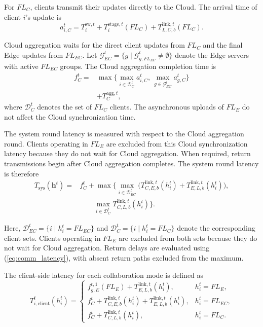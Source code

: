 \documentclass[5p,times]{elsarticle}
\theoremstyle{plain}
\theoremstyle{definition}
\theoremstyle{remark}
\begin{document}
For \(FL_C\), clients transmit their updates
directly to the Cloud. The arrival time of
client \(i\)'s update is
\begin{equation}
a_{i,C}^t
=
T_i^{\mathrm{sw},t}
+
T_i^{\mathrm{stage},t}(FL_C)
+
T_{L,C,b}^{\mathrm{link},t}(FL_C).
\end{equation}

Cloud aggregation waits for the direct client
updates from $FL_C$ and the final Edge updates
from $FL_{EC}$. 
Let $\mathcal G_{EC}^t
=\{g\mid\mathcal G_{g,FL_{EC}}^t
\neq\emptyset\}$ denote the Edge servers
with active $FL_{EC}$ groups. The Cloud aggregation
completion time is
\begin{equation}
\begin{aligned}
f_C^t
={}&
\max\Bigg\{
\max_{i\in\mathcal D_C^t} a_{i,C}^t,\,
\max_{g\in\mathcal G_{EC}^t} a_{g,C}^t
\Bigg\}\\
&+T_C^{\mathrm{agg},t},
\label{eq:cloud_agg_finish}
\end{aligned}
\end{equation}
where $\mathcal D_C^t$ denotes the set of
$FL_C$ clients. The asynchronous uploads
of $FL_E$ do not affect the Cloud
synchronization time.

The system round latency is measured with
respect to the Cloud aggregation round.
Clients operating in \(FL_E\) are excluded
from this Cloud synchronization latency
because they do not wait for Cloud aggregation.
When required, return transmissions begin
after Cloud aggregation completes.
The system round latency is therefore
\begin{equation}
\begin{aligned}
T_{\mathrm{sys}}(\mathbf h^t)
={}&f_C^t+\max\Bigg\{
\max_{i\in\mathcal D_{EC}^t}
\Big(
T_{C,E,b}^{\mathrm{link},t}(h_i^t)
+
T_{E,L,b}^{\mathrm{link},t}(h_i^t)
\Big),\\
&\qquad
\max_{i\in\mathcal D_C^t}
T_{C,L,b}^{\mathrm{link},t}(h_i^t)
\Bigg\}.
\end{aligned}
\label{eq:system_round_latency}
\end{equation}

Here, $\mathcal D_{EC}^t=\{i\mid h_i^t=FL_{EC}\}$
and $\mathcal D_C^t=\{i\mid h_i^t=FL_C\}$
denote the corresponding client sets.
Clients operating in \(FL_E\) are excluded
from both sets because they do not wait for
Cloud aggregation.
Return delays are evaluated using
(\ref{eq:comm_latency}), with absent
return paths excluded from the maximum.

The client-side latency for each collaboration
mode is defined as
\begin{equation}
T_{i,\mathrm{client}}^t(h_i^t)
=
\begin{cases}
f_{g,E}^{t,1}(FL_E)
+T_{E,L,b}^{\mathrm{link},t}(h_i^t),
& h_i^t=FL_E,\\[4pt]
f_C^t
+T_{C,E,b}^{\mathrm{link},t}(h_i^t)
+T_{E,L,b}^{\mathrm{link},t}(h_i^t),
& h_i^t=FL_{EC},\\[4pt]
f_C^t
+T_{C,L,b}^{\mathrm{link},t}(h_i^t),
& h_i^t=FL_C.
\end{cases}
\label{eq:client_latency}
\end{equation}
\end{document}

